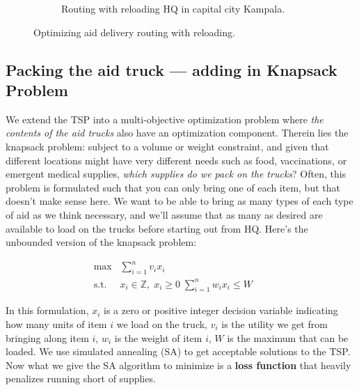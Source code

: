 \documentclass[a0,final]{a0poster}
\begin{document}
\begin{multicols}{3}
\begin{figure}[H]
\begin{subfigure}[b]{0.5\columnwidth}
    \caption{Routing with reloading HQ in capital city Kampala.}
    \label{fig:a2}
  \end{subfigure}
  \caption{Optimizing aid delivery routing with reloading.}
\end{figure}

\vspace{-15mm}

\subsection*{Packing the aid truck --- adding in Knapsack Problem}

\vspace{-6mm}

We extend the TSP into a multi-objective optimization problem
where \emph{the contents of the aid trucks} also have an optimization component. Therein lies
the knapsack problem: subject to a volume or weight constraint, and given that different locations
might have very different needs such as food, vaccinations, or emergent medical supplies, \emph{which supplies do we pack on the trucks}?  Often, this problem is formulated such that you can only bring one of each item, but that doesn't make sense here. We want to be able to bring as many types of each type of aid as we think necessary, and we'll assume that as many as desired are available to load on the trucks before starting out from HQ. Here's the unbounded version of the knapsack problem:

\columnbreak



\begin{align*}
\max &\sum_{i=1}^n v_i x_i &&  \\
\mathrm{s.t.} \; \; & x_i \in \mathbb{Z}, \; x_i \geq 0 \; \sum_{i=1}^n w_ix_i \leq W
\end{align*}

\noindent In this formulation, $x_{i}$ is a zero or positive integer decision variable indicating how many units of item $i$ we load on the truck, $v_i$ is the utility we get from bringing along item $i$, $w_i$ is the weight of item $i$, $W$ is the maximum that can be loaded. We use simulated annealing (SA) to get acceptable solutions to the TSP. Now what we give the SA algorithm to minimize is a \textbf{loss function} that heavily penalizes running short of supplies.

\vspace{-6mm}


\end{multicols}
\end{document}
